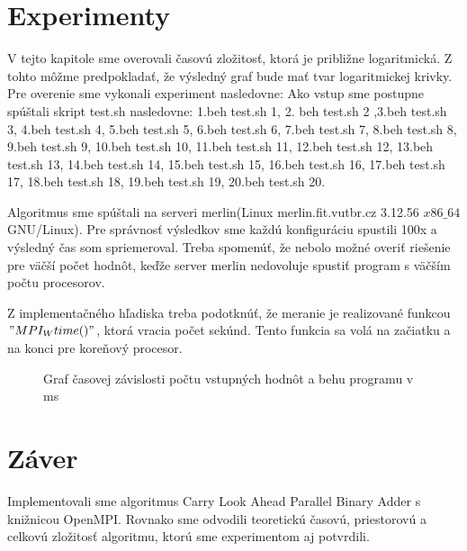 \documentclass[11pt,a4paper,titlepage,final]{article}
\begin{document}
\section{Experimenty}
V tejto kapitole sme overovali časovú zložitosť, ktorá je približne logaritmická. Z tohto môžme predpokladať, že výsledný graf bude mať tvar logaritmickej krivky. Pre overenie sme vykonali experiment nasledovne: Ako vstup sme postupne spúštali skript test.sh nasledovne: 1.beh test.sh 1, 2. beh test.sh 2 ,3.beh test.sh 3, 4.beh test.sh 4, 5.beh test.sh 5, 6.beh test.sh 6, 7.beh test.sh 7, 8.beh test.sh 8, 9.beh test.sh 9, 10.beh test.sh 10, 11.beh test.sh 11, 12.beh test.sh 12, 13.beh test.sh 13, 14.beh test.sh 14, 15.beh test.sh 15, 16.beh test.sh 16, 17.beh test.sh 17, 18.beh test.sh 18, 19.beh test.sh 19, 20.beh test.sh 20.

Algoritmus sme spúštali na serveri merlin(Linux merlin.fit.vutbr.cz 3.12.56 $x86\_64$ GNU/Linux). Pre správnosť výsledkov sme každú konfiguráciu spustili 100x a výsledný čas som spriemeroval. Treba spomenúť, že nebolo možné overiť riešenie pre väčší počet hodnôt, keďže server merlin nedovoluje spustiť program s väčším počtu procesorov.

Z implementačného hľadiska treba podotknúť, že meranie je realizované funkcou $"MPI_Wtime()"$, ktorá vracia počet sekúnd. Tento funkcia sa volá na začiatku a na konci pre koreňový procesor.
 \begin{figure}[h]

\begin{center}
\caption{Graf časovej závislosti počtu vstupných hodnôt a behu programu v ms}
\end{center}

\end{figure}

\section{Záver}
Implementovali sme algoritmus Carry Look Ahead Parallel Binary Adder s knižnicou OpenMPI. Rovnako sme odvodili teoretickú časovú, priestorovú a celkovú zložitosť algoritmu, ktorú sme experimentom aj potvrdili.
\end{document}
